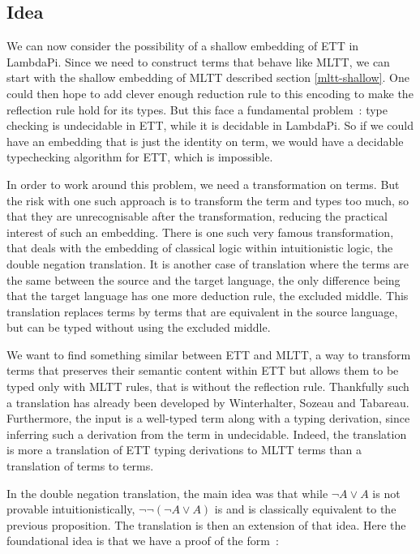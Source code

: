 
\subsection{Idea}

We can now consider the possibility of a shallow embedding of ETT in LambdaPi.
Since we need to construct terms that behave like MLTT, we can start with the
shallow embedding of MLTT described section \ref{mltt-shallow}. One could then
hope to add clever enough reduction rule to this encoding to make the reflection
rule hold for its types. But this face a fundamental problem~: type checking is
undecidable in ETT, while it is decidable in LambdaPi. So if we could have an
embedding that is just the identity on term, we would have a decidable
typechecking algorithm for ETT, which is impossible.

In order to work around this problem, we need a transformation on terms. But the
risk with one such approach is to transform the term and types too much, so that
they are unrecognisable after the transformation, reducing the practical
interest of such an embedding. There is one such very famous transformation,
that deals with the embedding of classical logic within intuitionistic logic,
the double negation translation. It is another case of translation where the
terms are the same between the source and the target language, the only
difference being that the target language has one more deduction rule, the
excluded middle. This translation replaces terms by terms that are equivalent in
the source language, but can be typed without using the excluded middle.

We want to find something similar between ETT and MLTT, a way to transform terms
that preserves their semantic content within ETT but allows them to be typed
only with MLTT rules, that is without the reflection rule. Thankfully such a
translation has already been developed by Winterhalter, Sozeau and
Tabareau\cite{winterhalter_eliminating_2019}.  Furthermore, the input is a
well-typed term along with a typing derivation, since inferring such a
derivation from the term in undecidable. Indeed, the translation is more a
translation of ETT typing derivations to MLTT terms than a translation of terms
to terms.

In the double negation translation, the main idea was that while $\neg A \vee A$ is
not provable intuitionistically, $\neg \neg (\neg A \vee A)$ is and is classically
equivalent to the previous proposition. The translation is then an extension of
that idea. Here the foundational idea is that we have a proof of the form~:

